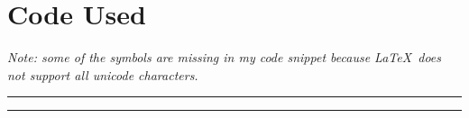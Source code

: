 \documentclass[a4paper,12pt]{article}
\begin{document}
\newpage
\section*{Code Used}

\emph{Note: some of the symbols are missing in my code snippet because \LaTeX\ does not support all unicode characters.}

\vspace{-0.5cm}
\rule{\textwidth}{.4pt}

\rule{\textwidth}{.4pt}
\end{document}
